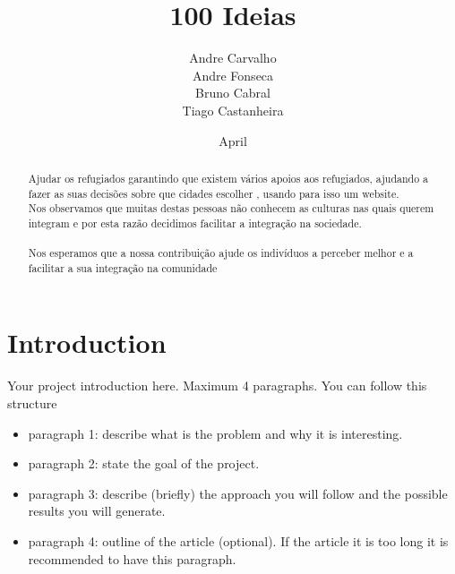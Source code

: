 \documentclass{article}
\title{100 Ideias}
\author{Andre Carvalho\\  Andre Fonseca\\ Bruno Cabral  \\ Tiago Castanheira\\ }
\date{April}
\begin{document}
\maketitle
\begin{abstract}
    Ajudar os refugiados garantindo que existem vários apoios aos refugiados, ajudando a fazer as suas decisões sobre que cidades escolher , usando para isso um website.\\
    
    Nos observamos que  muitas destas pessoas não conhecem as culturas nas quais querem integram e por esta razão decidimos facilitar a integração na sociedade.\\
    
    \\
    
    Nos esperamos que a nossa contribuição ajude os indivíduos a perceber melhor e a facilitar a sua integração na comunidade \\
    
    
\end{abstract}
\keywordlist

\section{Introduction}



Your project introduction here. Maximum 4 paragraphs. You can
follow this structure

\begin{itemize}
    \item paragraph 1: describe what is the problem and why it is
    interesting.
    \item paragraph 2: state the goal of the project.
    \item paragraph 3: describe (briefly) the approach you will
    follow and the possible results you will generate.
    \item paragraph 4: outline of the article (optional). If the
    article it is too long it is recommended to have this
    paragraph.


\end{itemize}
\end{document}
